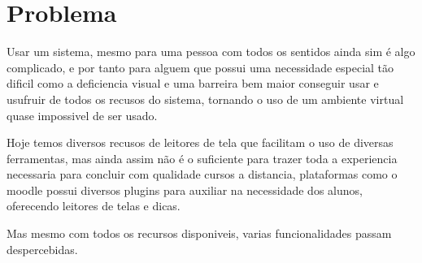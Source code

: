 \section{Problema}
Usar um sistema, mesmo para uma pessoa com todos os sentidos ainda sim é algo complicado, 
e por tanto para alguem que possui uma necessidade especial tão dificil como a deficiencia visual
e uma barreira bem maior conseguir usar e usufruir de todos os recusos do sistema, 
tornando o uso de um ambiente virtual quase impossivel de ser usado.

Hoje temos diversos recusos de leitores de tela que facilitam o uso de diversas ferramentas,
mas ainda assim não é o suficiente para trazer toda a experiencia necessaria para concluir com qualidade cursos a distancia,
plataformas como o moodle possui diversos plugins para auxiliar na necessidade dos alunos, oferecendo leitores de telas e dicas.

Mas mesmo com todos os recursos disponiveis, varias funcionalidades passam despercebidas.